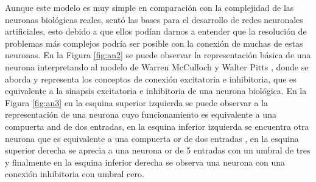 Aunque este modelo es muy simple en comparación con la complejidad de las neuronas biológicas reales, sentó las bases para el desarrollo de redes neuronales artificiales, esto debido a que ellos podían darnos a entender que la resolución de problemas más complejos  podría ser posible con la  conexión de muchas de estas neuronas. En la Figura \ref{fig:an2} se puede observar la representación básica de una neurona interpretando al modelo de Warren McCulloch y Walter Pitts , donde se aborda y representa los conceptos de conexión excitatoria e inhibitoria, que es equivalente a la sinapsis excitatoria e inhibitoria de una neurona biológica. En la Figura \ref{fig:an3} en la esquina superior izquierda se puede observar a la representación de una neurona cuyo funcionamiento es equivalente a una compuerta and de dos entradas, en la esquina inferior izquierda se encuentra otra neurona que es equivalente a una compuerta or de dos entradas , en la esquina superior derecha se aprecia a una neurona or de 5 entradas con un umbral de tres y finalmente en la esquina inferior derecha se observa una neurona con una  conexión inhibitoria con umbral cero.





